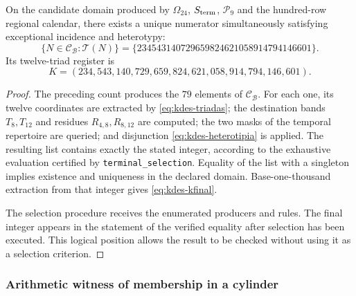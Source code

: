 \begin{theorem}
On the candidate domain produced by
$\Omega_{24}$, $\mathcal S_{\rm term}$, $\mathcal P_9$ and the hundred-row
regional calendar, there exists a unique numerator simultaneously satisfying
exceptional incidence and heterotypy:
\[
 \{N\in\mathcal C_{\mathcal B}:\mathcal T(N)\}
 =\{234543140729659824621058914794146601\}.
\]
Its twelve-triad register is
\begin{equation}
 K=(234,543,140,729,659,824,621,058,914,794,146,601).
 \label{eq:kdes-kfinal}
\end{equation}
\end{theorem}
\begin{proof}
The preceding count produces the $79$ elements of
$\mathcal C_{\mathcal B}$. For each one, its twelve
coordinates are extracted by \eqref{eq:kdes-triadas}; the destination bands
$T_8,T_{12}$ and residues $R_{4,8},R_{8,12}$ are computed; the
two masks of the temporal repertoire are queried; and disjunction
\eqref{eq:kdes-heterotipia} is applied. The resulting list contains exactly
the stated integer, according to the exhaustive evaluation certified by
\texttt{terminal\_selection}. Equality of the list with a singleton
implies existence and uniqueness in the declared domain. Base-one-thousand
extraction from that integer gives \eqref{eq:kdes-kfinal}.

The selection procedure receives the enumerated producers and rules.
The final integer appears in the statement of the verified
equality after selection has been executed. This logical position
allows the result to be checked without using it as a selection criterion.
\end{proof}

\subsubsection{Arithmetic witness of membership in a cylinder}

